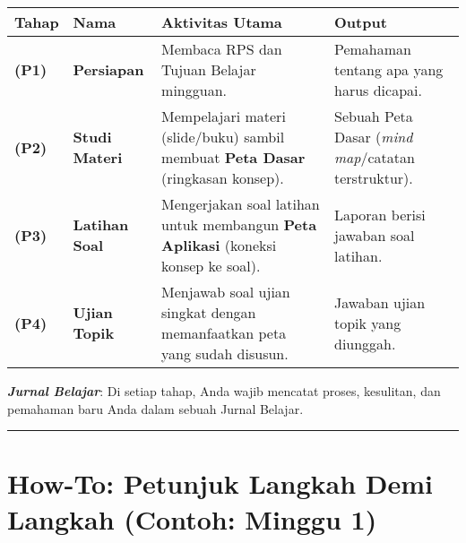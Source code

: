 \documentclass[
  letterpaper,
  DIV=11,
  numbers=noendperiod]{scrreprt}
\begin{document}
\begin{longtable}[]{@{}
  >{\raggedright\arraybackslash}p{}
  >{\raggedright\arraybackslash}p{}
  >{\raggedright\arraybackslash}p{}
  >{\raggedright\arraybackslash}p{}@{}}
\toprule\noalign{}
\begin{minipage}[b]{\linewidth}\raggedright
Tahap
\end{minipage} & \begin{minipage}[b]{\linewidth}\raggedright
Nama
\end{minipage} & \begin{minipage}[b]{\linewidth}\raggedright
Aktivitas Utama
\end{minipage} & \begin{minipage}[b]{\linewidth}\raggedright
Output
\end{minipage} \\
\midrule\noalign{}
\endhead
\bottomrule\noalign{}
\endlastfoot
\textbf{(P1)} & \textbf{Persiapan} & Membaca RPS dan Tujuan Belajar
mingguan. & Pemahaman tentang apa yang harus dicapai. \\
\textbf{(P2)} & \textbf{Studi Materi} & Mempelajari materi (slide/buku)
sambil membuat \textbf{Peta Dasar} (ringkasan konsep). & Sebuah Peta
Dasar (\emph{mind map}/catatan terstruktur). \\
\textbf{(P3)} & \textbf{Latihan Soal} & Mengerjakan soal latihan untuk
membangun \textbf{Peta Aplikasi} (koneksi konsep ke soal). & Laporan
berisi jawaban soal latihan. \\
\textbf{(P4)} & \textbf{Ujian Topik} & Menjawab soal ujian singkat
dengan memanfaatkan peta yang sudah disusun. & Jawaban ujian topik yang
diunggah. \\
\end{longtable}

\textbf{\emph{Jurnal Belajar}}: Di setiap tahap, Anda wajib mencatat
proses, kesulitan, dan pemahaman baru Anda dalam sebuah Jurnal Belajar.

\begin{center}\rule{0.5\linewidth}{0.5pt}\end{center}

\section*{\texorpdfstring{\textbf{How-To: Petunjuk Langkah Demi Langkah
(Contoh: Minggu
1)}}{How-To: Petunjuk Langkah Demi Langkah (Contoh: Minggu 1)}}\label{how-to-petunjuk-langkah-demi-langkah-contoh-minggu-1}
\end{document}
